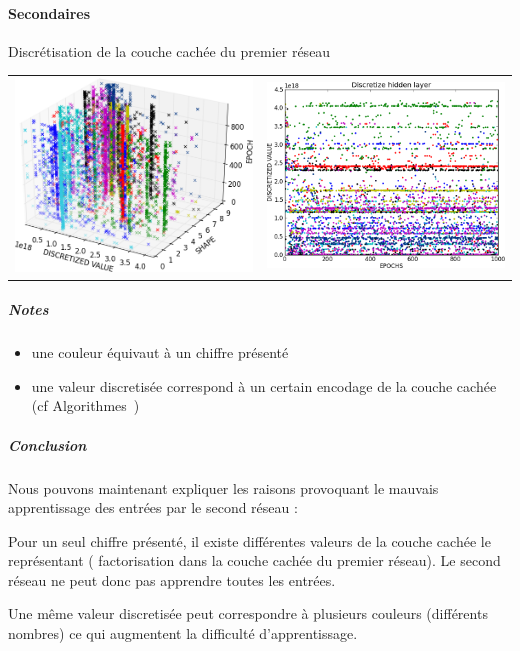     \paragraph{Secondaires}
      Discrétisation de la couche cachée du premier réseau
      \begin{center}
	\begin{tabular}{lr}
	  \hspace*{-1cm}
	  \includegraphics[width=250px]{data/expA3/discretize_cloud.png}
	  &
	  \includegraphics[width=250px]{data/expA3/discretize.png} 
	\end{tabular}
      \end{center} 
      \subparagraph{Notes}
	\begin{itemize}
	  \item une couleur équivaut à un chiffre présenté
	  \item une valeur discretisée correspond à un certain encodage de la couche cachée (cf Algorithmes~)
	\end{itemize}
      \subparagraph{Conclusion}
	Nous pouvons maintenant expliquer les raisons provoquant le mauvais apprentissage des entrées par le second réseau :
	
	Pour un seul chiffre présenté, il existe différentes valeurs de la couche cachée le représentant ( factorisation 
	dans la couche cachée du premier réseau). Le second réseau ne peut donc pas apprendre toutes les entrées.
	
	Une même valeur discretisée peut correspondre à plusieurs couleurs (différents nombres) ce qui augmentent la 
	difficulté d'apprentissage.
